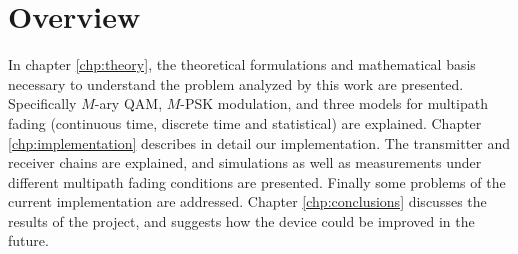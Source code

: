 \section{Overview}

In chapter \ref{chp:theory}, the theoretical formulations and mathematical basis necessary to understand the problem analyzed by this work are presented. Specifically \(M\)-ary QAM, \(M\)-PSK modulation, and three models for multipath fading (continuous time, discrete time and statistical) are explained. Chapter \ref{chp:implementation} describes in detail our implementation. The transmitter and receiver chains are explained, and simulations as well as measurements under different multipath fading conditions are presented. Finally some problems of the current implementation are addressed. Chapter \ref{chp:conclusions} discusses the results of the project, and suggests how the device could be improved in the future.
